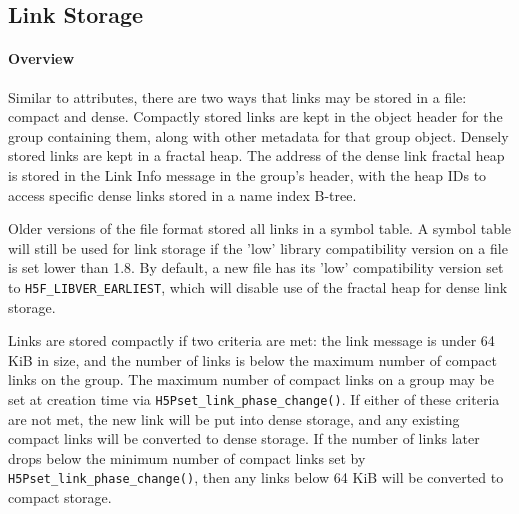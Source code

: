 \subsection{Link Storage}

\paragraph{Overview}  Similar to attributes, there are two ways that links may be stored in a file: compact and dense. Compactly stored links are kept in the object header for the group containing them, along with other metadata for that group object. Densely stored links are kept in a fractal heap. The address of the dense link fractal heap is stored in the Link Info message in the group's header, with the heap IDs to access specific dense links stored in a name index B-tree.

Older versions of the file format stored all links in a symbol table. A symbol table will still be used for link storage if the 'low' library compatibility version on a file is set lower than 1.8. By default, a new file has its 'low' compatibility version set to \texttt{H5F\_LIBVER\_EARLIEST}, which will disable use of the fractal heap for dense link storage.

Links are stored compactly if two criteria are met: the link message is under 64 KiB in size, and the number of links is below the maximum number of compact links on the group. The maximum number of compact links on a group may be set at creation time via \texttt{H5Pset\_link\_phase\_change()}. If either of these criteria are not met, the new link will be put into dense storage, and any existing compact links will be converted to dense storage. If the number of links later drops below the minimum number of compact links set by \texttt{H5Pset\_link\_phase\_change()}, then any links below 64 KiB will be converted to compact storage.

